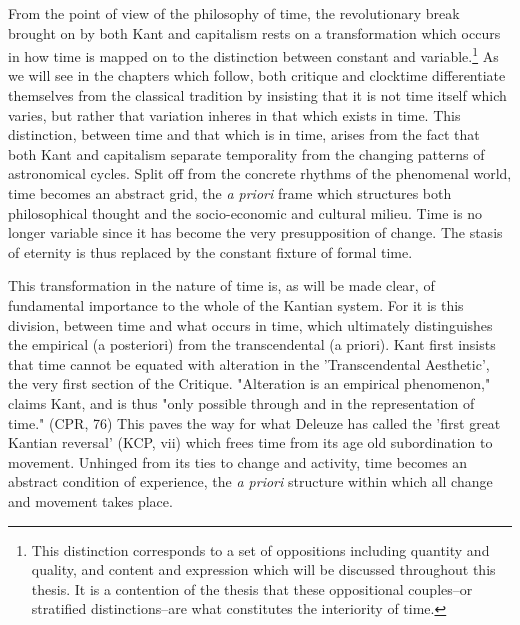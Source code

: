 From the point of view of the philosophy of time, the revolutionary break brought on by both Kant and capitalism rests on a transformation which occurs in how time is mapped on to the distinction between constant and variable.\footnote{This distinction corresponds to a set of oppositions including quantity and quality, and content and expression which will be discussed throughout this thesis. It is a contention of the thesis that these oppositional couples--or stratified distinctions--are what constitutes the interiority of time.} As we will see in the chapters which follow, both critique and clocktime differentiate themselves from the classical tradition by insisting that it is not time itself which varies, but rather that variation inheres in that which exists in time. This distinction, between time and that which is in time, arises from the fact that both Kant and capitalism separate temporality from the changing patterns of astronomical cycles. Split off from the concrete rhythms of the phenomenal world, time becomes an abstract grid, the \textit{a priori} frame which structures both philosophical thought and the socio-economic and cultural milieu. Time is no longer variable since it has become the very presupposition of change. The stasis of eternity is thus replaced by the constant fixture of formal time.

This transformation in the nature of time is, as will be made clear, of fundamental importance to the whole of the Kantian system. For it is this division, between time and what occurs in time, which ultimately distinguishes the empirical (a posteriori) from the transcendental (a priori). Kant first insists that time cannot be equated with alteration in the 'Transcendental Aesthetic', the very first section of the Critique. "Alteration is an empirical phenomenon," claims Kant, and is thus "only possible through and in the representation of time." (CPR, 76) This paves the way for what Deleuze has called the 'first great Kantian reversal' (KCP, vii) which frees time from its age old subordination to movement. Unhinged from its ties to change and activity, time becomes an abstract condition of experience, the \textit{a priori} structure within which all change and movement takes place.

